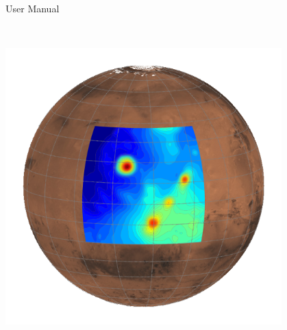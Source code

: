 
%
%

\usepackage{pstricks}
\usepackage{pifont}
\usepackage{paralist}
%
%
%



\frontmatter


\begin{titlepage} 
\mbox{}\\ 
\mbox{}\\
\begin{center}\Huge{User Manual}\end{center}
\mbox{}\\ 
\begin{center} 
\includegraphics[width=0.8\textwidth]{domain_100.png} 

\end{center}
\end{titlepage}
